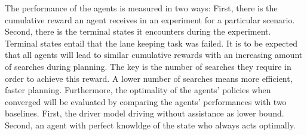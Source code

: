 
The performance of the agents is measured in two ways: First, there is the cumulative reward an agent receives in an experiment for a particular scenario. Second, there is the terminal states it encounters during the experiment. Terminal states entail that the lane keeping task was failed. It is to be expected that all agents will lead to similar cumulative rewards with an increasing amount of searches during planning. The key is the number of searches they require in order to achieve this reward. A lower number of searches means more efficient, faster planning. Furthermore, the optimality of the agents' policies when converged will be evaluated by comparing the agents' performances with two baselines. First, the driver model driving without assistance as lower bound. Second, an agent with perfect knowldge of the state who always acts optimally.

